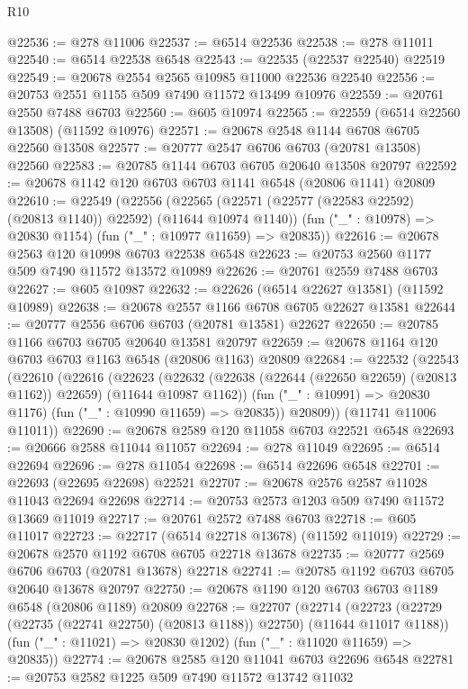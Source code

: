 \begin{lexlean}{R10}
\begin{coremodule}
{{{{{{{{{{{{{{{{{{{{{{{{{{{{{{{{{{{{{{{{{{{{{{{{{{{{{{{{{{{{{{{{{{{{{{{{{{{{{{{{{{{{@22536 := @278 @11006
@22537 := @6514 @22536
@22538 := @278 @11011
@22540 := @6514 @22538 @6548
@22543 := @22535 (@22537 @22540) @22519
@22549 := @20678 @2554 @2565 @10985 @11000 @22536 @22540
@22556 := @20753 @2551 @1155 @509 @7490 @11572 @13499 @10976
@22559 := @20761 @2550 @7488 @6703
@22560 := @605 @10974
@22565 := @22559 (@6514 @22560 @13508) (@11592 @10976)
@22571 := @20678 @2548 @1144 @6708 @6705 @22560 @13508
@22577 := @20777 @2547 @6706 @6703 (@20781 @13508) @22560
@22583 := @20785 @1144 @6703 @6705 @20640 @13508 @20797
@22592 := @20678 @1142 @120 @6703 @6703 @1141 @6548 (@20806 @1141) @20809
@22610 := @22549
    (@22556
      (@22565 (@22571 (@22577 (@22583 @22592) (@20813 @1140)) @22592) (@11644 @10974 @1140))
      (fun ("_" : @10978) => @20830 @1154)
      (fun ("_" : @10977 @11659) => @20835))
@22616 := @20678 @2563 @120 @10998 @6703 @22538 @6548
@22623 := @20753 @2560 @1177 @509 @7490 @11572 @13572 @10989
@22626 := @20761 @2559 @7488 @6703
@22627 := @605 @10987
@22632 := @22626 (@6514 @22627 @13581) (@11592 @10989)
@22638 := @20678 @2557 @1166 @6708 @6705 @22627 @13581
@22644 := @20777 @2556 @6706 @6703 (@20781 @13581) @22627
@22650 := @20785 @1166 @6703 @6705 @20640 @13581 @20797
@22659 := @20678 @1164 @120 @6703 @6703 @1163 @6548 (@20806 @1163) @20809
@22684 := @22532
    (@22543
      (@22610
        (@22616
          (@22623
            (@22632 (@22638 (@22644 (@22650 @22659) (@20813 @1162)) @22659) (@11644 @10987 @1162))
            (fun ("_" : @10991) => @20830 @1176)
            (fun ("_" : @10990 @11659) => @20835))
          @20809))
      (@11741 @11006 @11011))
@22690 := @20678 @2589 @120 @11058 @6703 @22521 @6548
@22693 := @20666 @2588 @11044 @11057
@22694 := @278 @11049
@22695 := @6514 @22694
@22696 := @278 @11054
@22698 := @6514 @22696 @6548
@22701 := @22693 (@22695 @22698) @22521
@22707 := @20678 @2576 @2587 @11028 @11043 @22694 @22698
@22714 := @20753 @2573 @1203 @509 @7490 @11572 @13669 @11019
@22717 := @20761 @2572 @7488 @6703
@22718 := @605 @11017
@22723 := @22717 (@6514 @22718 @13678) (@11592 @11019)
@22729 := @20678 @2570 @1192 @6708 @6705 @22718 @13678
@22735 := @20777 @2569 @6706 @6703 (@20781 @13678) @22718
@22741 := @20785 @1192 @6703 @6705 @20640 @13678 @20797
@22750 := @20678 @1190 @120 @6703 @6703 @1189 @6548 (@20806 @1189) @20809
@22768 := @22707
    (@22714
      (@22723 (@22729 (@22735 (@22741 @22750) (@20813 @1188)) @22750) (@11644 @11017 @1188))
      (fun ("_" : @11021) => @20830 @1202)
      (fun ("_" : @11020 @11659) => @20835))
@22774 := @20678 @2585 @120 @11041 @6703 @22696 @6548
@22781 := @20753 @2582 @1225 @509 @7490 @11572 @13742 @11032
}}}}}}}}}}}}}}}}}}}}}}}}}}}}}}}}}}}}}}}}}}}}}}}}}}}}}}}}}}}}}}}}}}}}}}}}}}}}}}}}}}}}
\end{coremodule}
\end{lexlean}
